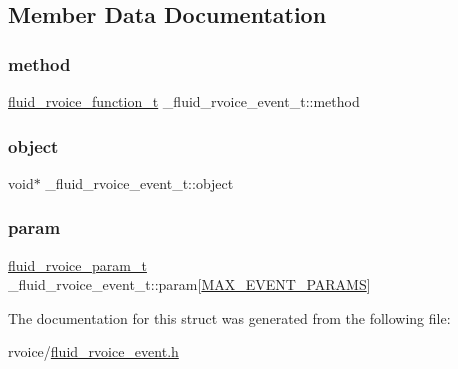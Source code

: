 \subsection{Member Data Documentation}
\mbox{\label{struct__fluid__rvoice__event__t_a6996b53072eb21fa652ae8a9e21af8b7}} 
\subsubsection{\texorpdfstring{method}{method}}
{\footnotesize\ttfamily \hyperlink{fluidsynth__priv_8h_a0060fc40a6e757de7831c327a50f367f}{fluid\+\_\+rvoice\+\_\+function\+\_\+t} \+\_\+fluid\+\_\+rvoice\+\_\+event\+\_\+t\+::method}

\mbox{\label{struct__fluid__rvoice__event__t_acb0e1885f335058c24135b2363bfec3a}} 
\subsubsection{\texorpdfstring{object}{object}}
{\footnotesize\ttfamily void$\ast$ \+\_\+fluid\+\_\+rvoice\+\_\+event\+\_\+t\+::object}

\mbox{\label{struct__fluid__rvoice__event__t_a7a9db4f028eb563d83802e8f474c563a}} 
\subsubsection{\texorpdfstring{param}{param}}
{\footnotesize\ttfamily \hyperlink{fluidsynth__priv_8h_a4a8827d32fba2a1b5404844259d3d4d0}{fluid\+\_\+rvoice\+\_\+param\+\_\+t} \+\_\+fluid\+\_\+rvoice\+\_\+event\+\_\+t\+::param\mbox{[}\hyperlink{fluidsynth__priv_8h_a726ca809ffd3d67ab4b8476646f26635a51ab886d33970c14e4b358ade8efee22}{M\+A\+X\+\_\+\+E\+V\+E\+N\+T\+\_\+\+P\+A\+R\+A\+MS}\mbox{]}}



The documentation for this struct was generated from the following file\+:\begin{DoxyCompactItemize}
\item 
rvoice/\hyperlink{fluid__rvoice__event_8h}{fluid\+\_\+rvoice\+\_\+event.\+h}\end{DoxyCompactItemize}
